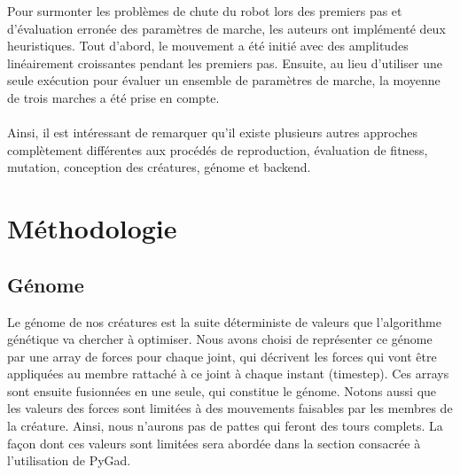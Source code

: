 \documentclass[journal, a4paper]{IEEEtran}
\begin{document}
Pour surmonter les problèmes de chute du robot lors des premiers pas et d'évaluation erronée des paramètres de marche, les auteurs ont implémenté deux heuristiques. Tout d'abord, le mouvement a été initié avec des amplitudes linéairement croissantes pendant les premiers pas. Ensuite, au lieu d'utiliser une seule exécution pour évaluer un ensemble de paramètres de marche, la moyenne de trois marches a été prise en compte.
\\ \\
Ainsi, il est intéressant de remarquer qu'il existe plusieurs autres approches complètement différentes aux procédés de reproduction, évaluation de fitness, mutation, conception des créatures, génome et backend.




\section{Méthodologie}\label{sec:met}

\subsection{Génome}
  
Le génome de nos créatures est la suite déterministe de valeurs que l'algorithme génétique va chercher à optimiser. Nous avons choisi de représenter ce génome par une array de forces pour chaque joint, qui décrivent les forces qui vont être appliquées au membre rattaché à ce joint à chaque instant (timestep). Ces arrays sont ensuite fusionnées en une seule, qui constitue le génome.
Notons aussi que les valeurs des forces sont limitées à des mouvements faisables par les membres de la créature. Ainsi, nous n'aurons pas de pattes qui feront des tours complets. La façon dont ces valeurs sont limitées sera abordée dans la section consacrée à l'utilisation de PyGad.
\end{document}
